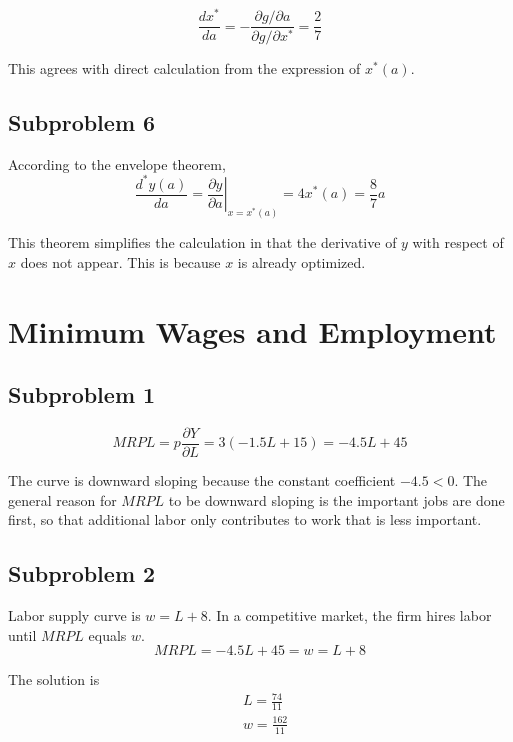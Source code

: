 \documentclass{article}
\begin{document}
\begin{equation*}
	\frac{dx^*}{da}=-\frac{\partial g/\partial a}{\partial g/\partial x^*}=\frac{2}{7}
\end{equation*}

This agrees with direct calculation from the expression of $x^*(a)$.

\subsection{Subproblem 6}
According to the envelope theorem,
\begin{equation*}
	\frac{d^*y(a)}{da}=\left.\frac{\partial y}{\partial a}\right|_{x=x^*(a)} =4x^*(a)=\frac{8}{7}a
\end{equation*}

This theorem simplifies the calculation in that the derivative of $y$ with respect of $x$ does not appear. This is because $x$ is already optimized.

\section{Minimum Wages and Employment}
\subsection{Subproblem 1}
\begin{equation*}
	MRPL=p\frac{\partial Y}{\partial L}=3(-1.5L+15)=-4.5L+45
\end{equation*}

The curve is downward sloping because the constant coefficient $-4.5<0$. The general reason for $MRPL$ to be downward sloping is the important jobs are done first, so that additional labor only contributes to work that is less important.

\subsection{Subproblem 2}
Labor supply curve is $w=L+8$. In a competitive market, the firm hires labor until $MRPL$ equals $w$.
\begin{equation*}
	MRPL=-4.5L+45=w=L+8
\end{equation*}

The solution is
\begin{align*}
	&L=\frac{74}{11}\\
	&w=\frac{162}{11}
\end{align*}
\end{document}
